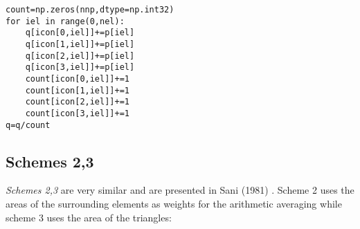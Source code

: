 \begin{lstlisting}
count=np.zeros(nnp,dtype=np.int32)  
for iel in range(0,nel):
    q[icon[0,iel]]+=p[iel]
    q[icon[1,iel]]+=p[iel]
    q[icon[2,iel]]+=p[iel]
    q[icon[3,iel]]+=p[iel]
    count[icon[0,iel]]+=1
    count[icon[1,iel]]+=1
    count[icon[2,iel]]+=1
    count[icon[3,iel]]+=1
q=q/count
\end{lstlisting}



\subsection{Schemes 2,3}

{\sl Schemes 2,3} are very similar and are presented in Sani \etal (1981) \cite{sagl81a,sagl81b}.
Scheme 2 uses the areas of the surrounding elements as weights for the arithmetic averaging
while scheme 3 uses the area of the triangles:

